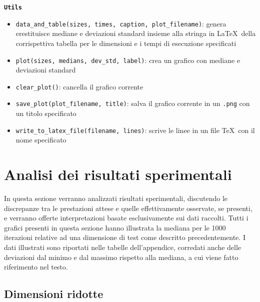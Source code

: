 \documentclass[onecolumn]{article}
\begin{document}
\newpage
{\setlength{\parindent}{0em} \texttt{\textbf{Utils}}}
\begin{itemize}
	\setlength\itemsep{0em}
	\item \verb|data_and_table(sizes, times, caption, plot_filename)|: genera e\newline restituisce mediane e deviazioni standard insieme alla stringa in \LaTeX\ della corrispettiva tabella per le dimensioni e i tempi di esecuzione specificati
	\item \verb|plot(sizes, medians, dev_std, label)|: crea un grafico con mediane e deviazioni standard
	\item \verb|clear_plot()|: cancella il grafico corrente
	\item \verb|save_plot(plot_filename, title)|: salva il grafico corrente in un \verb|.png| con un titolo specificato
	\item \verb|write_to_latex_file(filename, lines)|: scrive le linee in un file \TeX\ con il nome specificato
\end{itemize}

\newpage
\section{Analisi dei risultati sperimentali}

In questa sezione verranno analizzati risultati sperimentali, discutendo le discrepanze tra le prestazioni attese e quelle effettivamente osservate, se presenti, e verranno offerte interpretazioni basate esclusivamente sui dati raccolti. Tutti i grafici presenti in questa sezione hanno illustrata la mediana per le 1000 iterazioni relative ad una dimensione di test come descritto precedentemente. I dati illustrati sono riportati nelle tabelle dell'appendice, corredati anche delle deviazioni dal minimo e dal massimo rispetto alla mediana, a cui viene fatto riferimento nel testo.

\subsection{Dimensioni ridotte}
\end{document}
